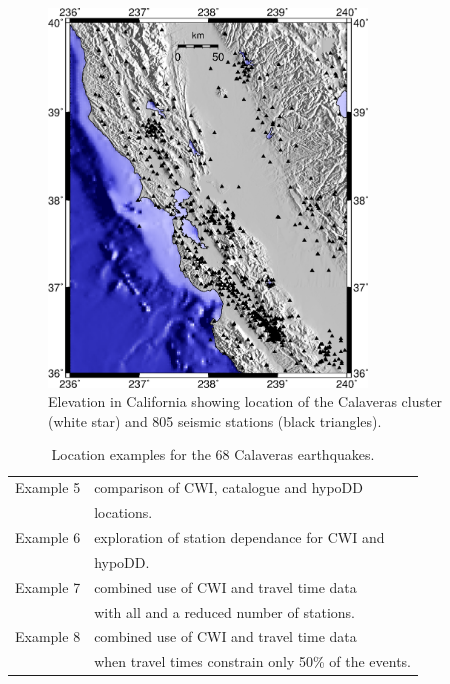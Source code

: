 \documentclass[extra]{gji}
\begin{document}
\begin{figure}
\noindent\includegraphics[width =
20pc]{diags/CalaverasMap/gmt_california/CaliforniaCalaverasMap1.eps}
\caption{Elevation in California showing location of the Calaveras
cluster (white star) and 805 seismic stations (black triangles).}
\label{fig:-eqopti-California-Calaveras}
\end{figure}


\begin{table}
\caption{Location examples for the 68 Calaveras earthquakes.}
\label{tab:examples}
\begin{tabular}{ll}
\hline
Example 5 & comparison of CWI, catalogue and hypoDD \\
 & locations. \\
Example 6 & exploration of station dependance for CWI and \\
 & hypoDD. \\
Example 7 & combined use of CWI and travel time data \\
& with all and a reduced number of stations. \\
Example 8 & combined use of CWI and travel time data \\
 & when travel times constrain only 50\% of the events. \\
 \hline
\end{tabular}
\end{table}
\end{document}
